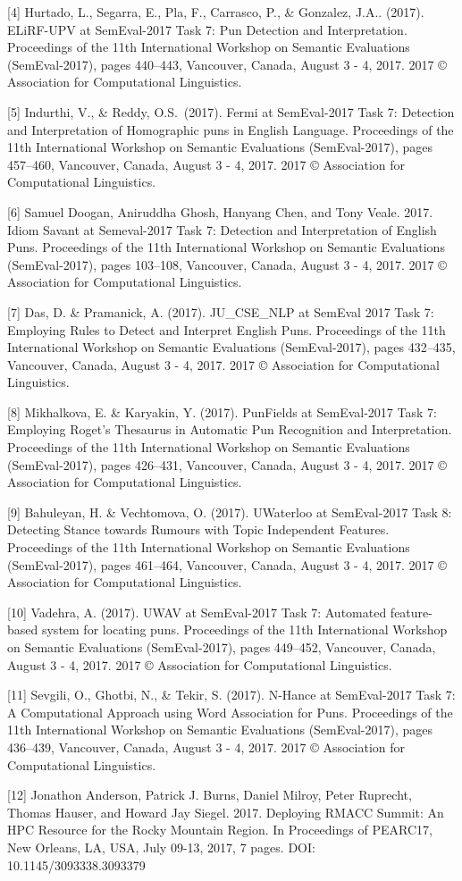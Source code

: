 \documentclass{article}
\begin{document}
[4] Hurtado, L., Segarra, E., Pla, F., Carrasco, P., \& Gonzalez, J.A..
(2017). ELiRF-UPV at SemEval-2017 Task 7: Pun Detection and Interpretation.
Proceedings of the 11th International Workshop on Semantic Evaluations
(SemEval-2017), pages 440–443, Vancouver, Canada, August 3 - 4,
2017. 2017 © Association for Computational Linguistics.

[5] Indurthi, V., \&  Reddy, O.S.\ (2017). Fermi at SemEval-2017 Task
7: Detection and Interpretation of Homographic puns in English Language.
Proceedings of the 11th International Workshop on Semantic Evaluations
(SemEval-2017), pages 457–460, Vancouver, Canada, August 3 - 4, 2017. 2017 ©
Association for Computational Linguistics.

[6] Samuel Doogan, Aniruddha Ghosh, Hanyang Chen, and Tony Veale. 2017. Idiom
Savant at Semeval-2017 Task 7: Detection and Interpretation of English Puns.
Proceedings of the 11th International Workshop on Semantic Evaluations
(SemEval-2017), pages 103–108, Vancouver, Canada, August 3 - 4, 2017. 2017 ©
Association for Computational Linguistics.

[7] Das, D. \& Pramanick, A. (2017). JU\_CSE\_NLP at SemEval 2017 Task 7:
Employing Rules to Detect and Interpret English Puns. Proceedings of the 11th
International Workshop on Semantic Evaluations (SemEval-2017), pages 432–435,
Vancouver, Canada, August 3 - 4, 2017. 2017 © Association for Computational
Linguistics.

[8] Mikhalkova, E. \& Karyakin, Y. (2017). PunFields at SemEval-2017 Task 7:
Employing Roget’s Thesaurus in Automatic Pun Recognition and Interpretation.
Proceedings of the 11th International Workshop on Semantic Evaluations
(SemEval-2017), pages 426–431, Vancouver, Canada, August 3 - 4, 2017. 2017 ©
Association for Computational Linguistics.

[9] Bahuleyan, H. \& Vechtomova, O. (2017). UWaterloo at SemEval-2017 Task 8:
Detecting Stance towards Rumours with Topic Independent Features. Proceedings
of the 11th International Workshop on Semantic Evaluations (SemEval-2017),
pages 461–464, Vancouver, Canada, August 3 - 4, 2017. 2017 © Association for
Computational Linguistics.

[10] Vadehra, A. (2017). UWAV at SemEval-2017 Task 7: Automated feature-based
system for locating puns. Proceedings of the 11th International Workshop on
Semantic Evaluations (SemEval-2017), pages 449–452, Vancouver, Canada, August 3
- 4, 2017. 2017 © Association for Computational Linguistics.

[11] Sevgili, O., Ghotbi, N., \& Tekir, S. (2017). N-Hance at SemEval-2017 Task
7: A Computational Approach using Word Association for Puns. Proceedings of the
11th International Workshop on Semantic Evaluations (SemEval-2017), pages
436–439, Vancouver, Canada, August 3 - 4, 2017. 2017 © Association for
Computational Linguistics.

[12] Jonathon Anderson, Patrick J. Burns, Daniel Milroy, Peter Ruprecht, Thomas Hauser, and Howard Jay Siegel. 2017. Deploying RMACC Summit: An HPC Resource for the Rocky Mountain Region. In Proceedings of PEARC17, New Orleans, LA, USA, July 09-13, 2017, 7 pages. DOI: 10.1145/3093338.3093379
\end{document}
